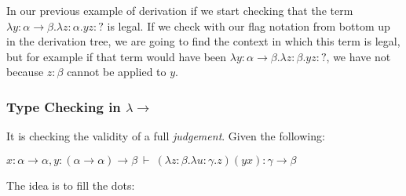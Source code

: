 \documentclass[12pt, a4paper]{article}
\newcommand{\deriv}{\ \vdash\ }
\begin{document}
In our previous example of derivation if we start checking that the term $\lambda y : \alpha \to \beta . \lambda z : \alpha . yz : ?$ is legal.
If we check with our flag notation from bottom up in the derivation tree, we are going to find the context in which this term is legal, but for example
if that term would have been $\lambda y : \alpha \to \beta . \lambda z : \beta . yz : ?$, we have not because $z : \beta$ cannot be applied to $y$.

\subsubsection{Type Checking in \texorpdfstring{$\lambda\to$}{Lg}}
It is checking the validity of a full \textit{judgement}.
Given the following: 

$x : \alpha \to \alpha, y : (\alpha \to \alpha) \to \beta \deriv (\lambda z : \beta . \lambda u : \gamma . z)(yx) : \gamma \to \beta$

\begin{flagderiv}
    \skipsteps*{\vdots}{}
  \end{flagderiv}

The idea is to fill the dots:

\begin{flagderiv}
    \skipsteps*{\vdots}{}
  \end{flagderiv}

  \begin{flagderiv}
  \end{flagderiv}
\end{document}
